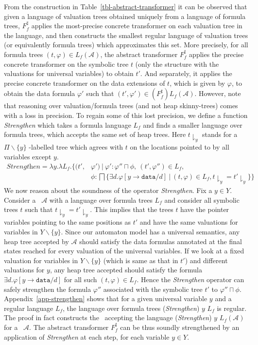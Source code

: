 \documentclass{llncs}
\newcommand{\A}{\mathcal{A}}
\newcommand{\data}{\texttt{data}}
\begin{document}
From the construction in Table~\ref{tbl-abstract-transformer} it can be observed that given a language of valuation trees obtained uniquely from a language of formula trees, $F_f^\sharp$ applies the most-precise concrete transformer on each valuation tree in the language, and then constructs the smallest regular language of valuation trees (or equivalently formula trees) which approximates this set.
More precisely, for all formula trees $(t, \varphi) \in L_f(\A)$, the abstract transformer $F_f^\sharp$ applies the precise concrete transformer on the symbolic tree $t$ (only the structure with the valuations for universal variables) to obtain $t'$. And separately, it applies the precise concrete transformer on the data extensions of $t$, which is given by $\varphi$, to obtain the data formula  $\varphi'$ such that $(t', \varphi') \in (F_f^\sharp) L_f(\A)$.
However, note that reasoning over valuation/formula trees (and not heap skinny-trees) comes with a loss in precision.
To regain some of this lost precision, we define a function \emph{Strengthen} which takes a formula language $L_f$ and finds a smaller language over formula trees, which accepts the same set of heap trees. Here $t \downharpoonright_y$ stands for a $\Pi \backslash \{y\}$ -labelled tree which agrees with $t$ on the locations pointed to by all variables except $y$.
\begin{align}
\textit{Strengthen} =   \lambda y. \lambda L_f. \big\{ (t', &\varphi') ~ | ~ \varphi': \varphi'' \sqcap \phi, ~(t', \varphi'') \in L_f,  \nonumber \\
	  		& \phi: \bigsqcap \{ \exists d. \varphi[y\rightarrow\data/d] ~|~ (t, \varphi) \in L_f, t \downharpoonright_y = t' \downharpoonright_y \}   \big\} \nonumber
\end{align}
\noindent We now reason about the soundness of the operator \emph{Strengthen}. Fix a $y \in Y$. Consider a \QSDA\ $\A$ with a language over formula trees $L_f$ and consider all symbolic trees $t$ such that $t \downharpoonright_y = t' \downharpoonright_y$. This implies that
the trees $t$ have the pointer variables pointing to the same positions as $t'$
and have the same valuations for variables in $Y \backslash \{y\}$.
Since our automaton model has a universal semantics, any heap tree accepted by $\A$ should satisfy the data formulas annotated at the final states reached for every valuation of the universal variables. If we look at a fixed valuation for variables in $Y \backslash \{y\}$ (which is same as that in $t'$) and different valuations for $y$, any heap tree accepted should satisfy the formula $\exists d. \varphi[y\rightarrow\data/d]$ for all such $(t, \varphi) \in L_f$. Hence the \emph{Strengthen} operator can safely strengthen the formula $\varphi''$ associated with the symbolic tree $t'$ to $\varphi'' \sqcap \phi$.
Appendix~\ref{app-strengthen} shows that for a given universal variable $y$ and a regular language $L_f$, the language over formula trees (\textit{Strengthen}) $y$ $L_f$ is regular. The proof in fact constructs the \QSDA\ accepting the language (\textit{Strengthen}) $y$ $L_f(\A)$ for a \QSDA\ $\A$.
The abstract transformer $F_f^\sharp$ can be thus soundly strengthened by an application of \textit{Strengthen} at each step, for each variable $y \in Y$.
\end{document}
